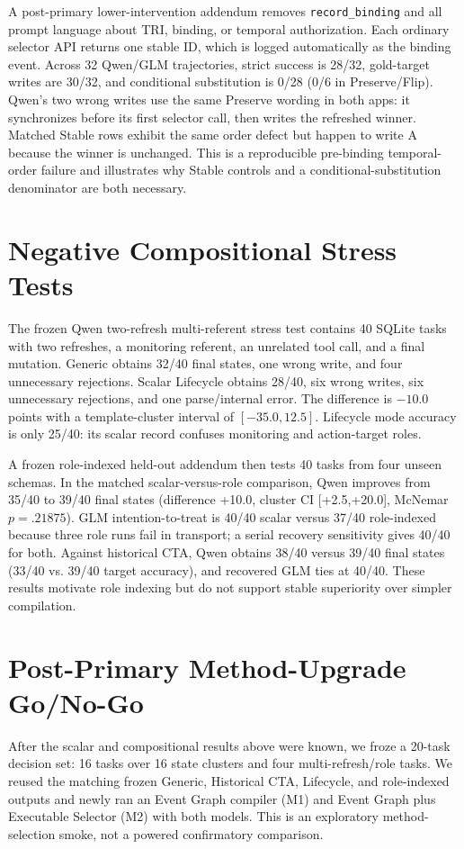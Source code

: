 \documentclass[10pt]{article}
\begin{document}
A post-primary lower-intervention addendum removes \texttt{record\_binding} and all prompt
language about TRI, binding, or temporal authorization. Each ordinary selector API returns one
stable ID, which is logged automatically as the binding event. Across 32 Qwen/GLM trajectories,
strict success is 28/32, gold-target writes are 30/32, and conditional substitution is 0/28 (0/6 in
Preserve/Flip). Qwen's two wrong writes use the same Preserve wording in both apps: it synchronizes
before its first selector call, then writes the refreshed winner. Matched Stable rows exhibit the
same order defect but happen to write A because the winner is unchanged. This is a reproducible
pre-binding temporal-order failure and illustrates why Stable controls and a conditional-substitution
denominator are both necessary.

\section{Negative Compositional Stress Tests}
The frozen Qwen two-refresh multi-referent stress test contains 40 SQLite tasks with two refreshes, a monitoring
referent, an unrelated tool call, and a final mutation. Generic obtains 32/40 final states,
one wrong write, and four unnecessary rejections. Scalar Lifecycle obtains 28/40, six wrong
writes, six unnecessary rejections, and one parse/internal error. The difference is $-10.0$
points with a template-cluster interval of $[-35.0,12.5]$. Lifecycle mode accuracy is only
25/40: its scalar record confuses monitoring and action-target roles.

A frozen role-indexed held-out addendum then tests 40 tasks from four unseen schemas. In the
matched scalar-versus-role comparison, Qwen improves from 35/40 to 39/40 final states
(difference +10.0, cluster CI [+2.5,+20.0], McNemar $p=.21875$). GLM intention-to-treat is
40/40 scalar versus 37/40 role-indexed because three role runs fail in transport; a serial
recovery sensitivity gives 40/40 for both. Against historical CTA, Qwen obtains 38/40 versus
39/40 final states (33/40 vs. 39/40 target accuracy), and recovered GLM ties at 40/40. These results motivate role indexing but do not support
stable superiority over simpler compilation.

\section{Post-Primary Method-Upgrade Go/No-Go}
After the scalar and compositional results above were known, we froze a 20-task decision set:
16 \NewSchemaReplication{} tasks over 16 state clusters and four multi-refresh/role tasks. We reused the
matching frozen Generic, Historical CTA, Lifecycle, and role-indexed outputs and newly ran an Event
Graph compiler (M1) and Event Graph plus Executable Selector (M2) with both models. This is an
exploratory method-selection smoke, not a powered confirmatory comparison.
\end{document}
